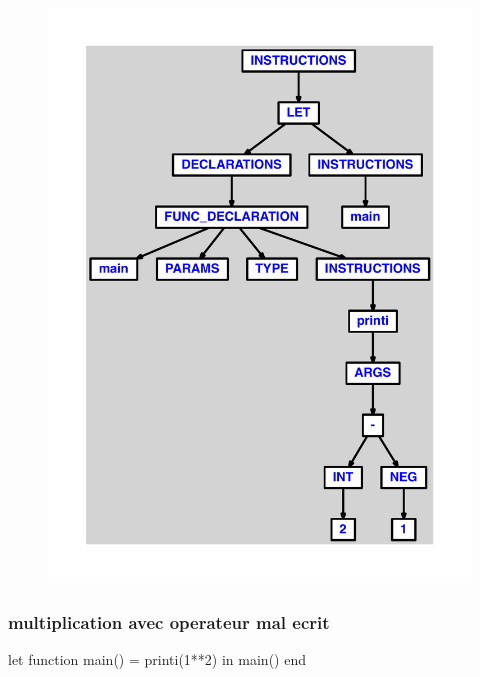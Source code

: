 \documentclass{article}
\begin{document}
\begin{figure}[H]\centering\includegraphics[max width=\textwidth]{ast/ast_23.pdf}\end{figure}\subsubsection{multiplication avec operateur mal ecrit}
\begin{verbatimtab}
let
	function main() = printi(1**2)
in main() end
\end{verbatimtab}
\end{document}
